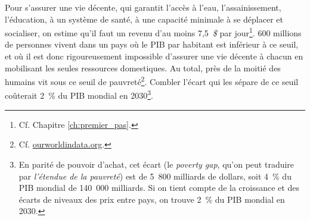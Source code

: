 \documentclass[a5paper,french,openany]{memoir}
\begin{document}
Pour s'assurer une vie décente, qui garantit l'accès à l'eau, l'assainissement, l'éducation, à un système de santé, à une capacité minimale à se déplacer et socialiser, on estime qu'il faut un revenu d'au moins 7,5~\textit{\$} par jour\footnote{Cf. Chapitre \ref{ch:premier_pas}.}. 
600 millions de personnes vivent dans un pays où le PIB par habitant est inférieur à ce seuil, et où il est donc rigoureusement impossible d'assurer une vie décente à chacun en mobilisant les seules ressources domestiques. 
Au total, près de la moitié des humains vit sous ce seuil de pauvreté\footnote{Cf. \href{https://ourworldindata.org/grapher/distribution-of-population-between-different-poverty-thresholds-up-to-30-dollars}{ourworldindata.org}.}. Combler l'écart qui les sépare de ce seuil coûterait 2~\% du PIB mondial en 2030\footnote{En parité de pouvoir d'achat, cet écart (le \textit{poverty gap}, qu'on peut traduire par \textit{l'étendue de la pauvreté}) est de 5~800 milliards de dollars, soit 4~\% du PIB mondial de 140~000 milliards. Si on tient compte de la croissance et des écarts de niveaux des prix entre pays, on trouve %
2~\% du PIB mondial en 2030.}. %
\end{document}
